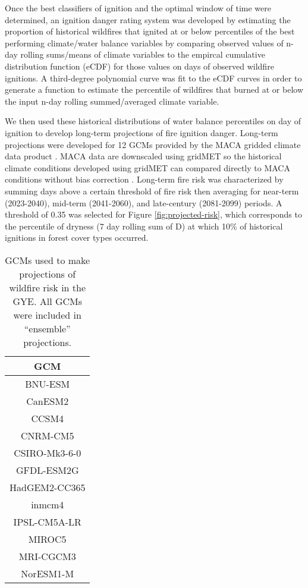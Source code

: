 \documentclass[11pt]{article}
\begin{document}
Once the best classifiers of ignition and the optimal window of time were determined, an ignition danger rating system was developed by estimating the proportion of historical wildfires that ignited at or below percentiles of the best performing climate/water balance variables by comparing observed values of n-day rolling sums/means of climate variables to the empircal cumulative distribution function (eCDF) for those values on days of observed wildfire ignitions. A third-degree polynomial curve was fit to the eCDF curves in order to generate a function to estimate the percentile of wildfires that burned at or below the input n-day rolling summed/averaged climate variable. 

We then used these historical distributions of water balance percentiles on day of ignition to develop long-term projections of fire ignition danger.  Long-term projections were developed for 12 GCMs provided by the MACA gridded climate data product \citep{abatzoglouComparisonStatisticalDownscaling2012}.  MACA data are downscaled using gridMET so the historical climate conditions developed using gridMET can compared directly to MACA conditions without bias correction \citep{tercekRobustProjectionsConsequences2023}.  Long-term fire risk was characterized by summing days above a certain threshold of fire risk then averaging for near-term (2023-2040), mid-term (2041-2060), and late-century (2081-2099) periods.  A threshold of 0.35 was selected for Figure \ref{fig:projected-risk}, which corresponds to the percentile of dryness (7 day rolling sum of D) at which 10\% of historical ignitions in forest cover types occurred.

\begin{table}[h!]
  \centering
  \begin{tabular}{ c }
    \hline
    GCM \\
    \hline
    BNU-ESM \\
    CanESM2 \\
    CCSM4 \\
    CNRM-CM5 \\
    CSIRO-Mk3-6-0 \\
    GFDL-ESM2G \\
    HadGEM2-CC365 \\
    inmcm4 \\
    IPSL-CM5A-LR \\
    MIROC5 \\
    MRI-CGCM3 \\
    NorESM1-M \\
    \hline
  \end{tabular}
  \caption{GCMs used to make projections of wildfire risk in the GYE.  All GCMs were included in ``ensemble'' projections.}
  \label{table:gcms}
\end{table}
\end{document}
